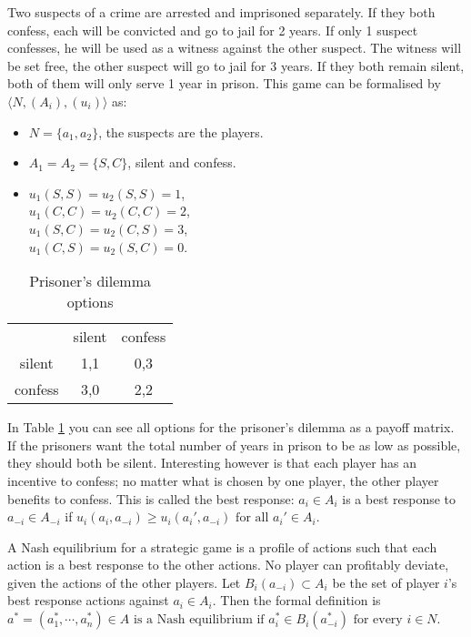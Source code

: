 Two suspects of a crime are arrested and imprisoned separately. If they both confess, each will be convicted and go to jail for 2 years. If only 1 suspect confesses, he will be used as a witness against the other suspect. The witness will be set free, the other suspect will go to jail for 3 years. If they both remain silent, both of them will only serve 1 year in prison. This game can be formalised by $\langle N, (A_i), (u_i) \rangle$ as:
\begin{itemize}
	\item $N = \{a_{1}, a_{2} \}$, the suspects are the players.
    \item $A_1 = A_2 = \{S, C\}$, silent and confess.
    \item $u_1(S, S) = u_2(S, S) = 1$, \\
    $u_1(C, C) = u_2(C, C) = 2$, \\
    $u_1(S, C) = u_2(C, S) = 3$, \\
    $u_1(C, S) = u_2(S, C) = 0$.

\end{itemize}

\begin{table}[h]
\centering
\begin{tabular}{ccc}
                             & silent                   & confess                   \\ \cline{2-3} 
\multicolumn{1}{c|}{silent}  & \multicolumn{1}{c|}{1,1} & \multicolumn{1}{c|}{0,3} \\ \cline{2-3} 
\multicolumn{1}{c|}{confess} & \multicolumn{1}{c|}{3,0} & \multicolumn{1}{c|}{2,2} \\ \cline{2-3} 
\end{tabular}
\caption{Prisoner's dilemma options}
\label{prisoners-d}
\end{table}

In Table \ref{prisoners-d} you can see all options for the prisoner's dilemma as a payoff matrix. 
If the prisoners want the total number of years in prison to be as low as possible, they should both be silent. Interesting however is that each player has an incentive to confess; no matter what is chosen by one player, the other player benefits to confess. This is called the best response: $a_i \in A_i $ is a best response to $ a_{-i} \in A_{-i} $ if $u_i(a_i, a_{-i}) \geq u_i(a_{i}', a_{-i}) \mbox{ for all } a_{i}' \in A_i$.

A Nash equilibrium for a strategic game is a profile of actions such that each action is a best response to the other actions. No player can profitably deviate, given the actions of the other players. Let $B_i(a_{-i}) \subset A_i$ be the set of player $i$'s best response actions against $a_i \in A_i$. Then the formal definition is
$a^* = (a^*_1, \cdots, a^*_n) \in A \mbox{ is a Nash equilibrium if }
	a^*_i \in B_i(a_{-i}^*) \mbox{ for every } i \in N$.

